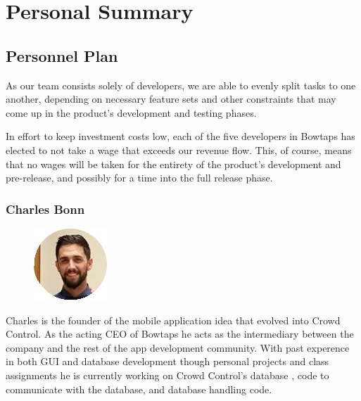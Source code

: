 
\graphicspath{ {Pictures/} }

\chapter{Personal Summary}

\section{Personnel Plan}

As our team consists solely of developers, we are able to evenly split tasks to one another, depending on necessary feature sets and other constraints that may come up in the product’s development and testing phases.

In effort to keep investment costs low, each of the five developers in Bowtaps has elected to not take a wage that exceeds our revenue flow. This, of course, means that no wages will be taken for the entirety of the product’s development and pre-release, and possibly for a time into the full release phase.\\





\subsection{Charles Bonn}
\begin{figure}
\includegraphics{charlesbonn}
\end{figure}

Charles is the founder of the mobile application idea that evolved into Crowd Control. As the acting CEO of Bowtaps he acts as the intermediary between the company and the rest of the app development community.  With past experence in both GUI and database development though personal projects and class assignments he is currently working on Crowd Control's database , code to communicate with the database, and database handling code.
\newline
\newline
\newline

